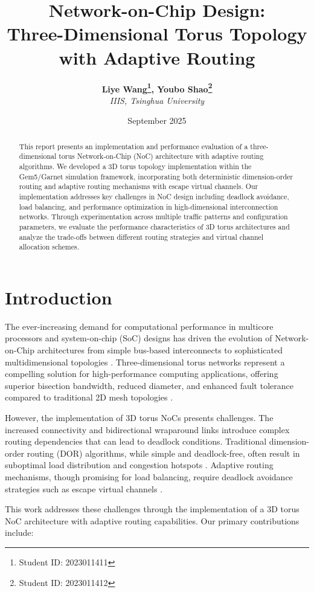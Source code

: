 \documentclass[a4paper,12pt]{article}
\title{\textbf{Network-on-Chip Design:\\Three-Dimensional Torus Topology with Adaptive Routing}}
\author{\textbf{Liye Wang\footnote{Student ID: 2023011411}, Youbo Shao\footnote{Student ID: 2023011412}}\\
        \textit{IIIS, Tsinghua University}}
\date{September 2025}
\begin{document}
\maketitle

\begin{abstract}
This report presents an implementation and performance evaluation of a three-dimensional torus Network-on-Chip (NoC) architecture with adaptive routing algorithms. We developed a 3D torus topology implementation within the Gem5/Garnet simulation framework, incorporating both deterministic dimension-order routing and adaptive routing mechanisms with escape virtual channels. Our implementation addresses key challenges in NoC design including deadlock avoidance, load balancing, and performance optimization in high-dimensional interconnection networks. Through experimentation across multiple traffic patterns and configuration parameters, we evaluate the performance characteristics of 3D torus architectures and analyze the trade-offs between different routing strategies and virtual channel allocation schemes.
\end{abstract}

\section{Introduction}

The ever-increasing demand for computational performance in multicore processors and system-on-chip (SoC) designs has driven the evolution of Network-on-Chip architectures from simple bus-based interconnects to sophisticated multidimensional topologies \cite{dally2001route, duato2002interconnection}. Three-dimensional torus networks represent a compelling solution for high-performance computing applications, offering superior bisection bandwidth, reduced diameter, and enhanced fault tolerance compared to traditional 2D mesh topologies \cite{scott2006blackwidow}.

However, the implementation of 3D torus NoCs presents challenges. The increased connectivity and bidirectional wraparound links introduce complex routing dependencies that can lead to deadlock conditions. Traditional dimension-order routing (DOR) algorithms, while simple and deadlock-free, often result in suboptimal load distribution and congestion hotspots \cite{glass1992turn}. Adaptive routing mechanisms, though promising for load balancing, require deadlock avoidance strategies such as escape virtual channels \cite{duato2002new}.

This work addresses these challenges through the implementation of a 3D torus NoC architecture with adaptive routing capabilities. Our primary contributions include:
\end{document}
